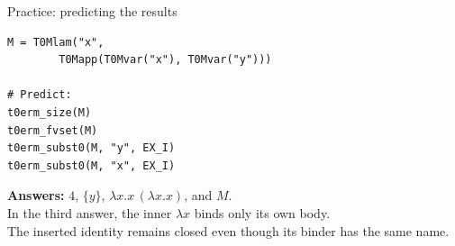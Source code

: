 \documentclass[aspectratio=169,11pt]{beamer}
\begin{document}
\begin{frame}[fragile]{Practice: predicting the results}
\begin{lstlisting}
M = T0Mlam("x",
        T0Mapp(T0Mvar("x"), T0Mvar("y")))

# Predict:
t0erm_size(M)
t0erm_fvset(M)
t0erm_subst0(M, "y", EX_I)
t0erm_subst0(M, "x", EX_I)
\end{lstlisting}
\pause
\medskip
\textbf{Answers:} $4$, $\{y\}$, $\lambda x.x\,(\lambda x.x)$, and $M$.\\[0.6em]
In the third answer, the inner $\lambda x$ binds only its own body.\\
The inserted identity remains closed even though its binder has the same name.
\end{frame}
\end{document}
